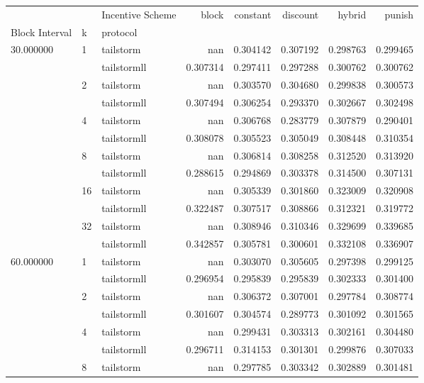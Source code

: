 \begin{tabular}{lllrrrrr}
 &  & Incentive Scheme & block & constant & discount & hybrid & punish \\
Block Interval & k & protocol &  &  &  &  &  \\
\multirow[c]{12}{*}{30.000000} & \multirow[c]{2}{*}{1} & tailstorm & nan & 0.304142 & 0.307192 & 0.298763 & 0.299465 \\
 &  & tailstormll & 0.307314 & 0.297411 & 0.297288 & 0.300762 & 0.300762 \\
 & \multirow[c]{2}{*}{2} & tailstorm & nan & 0.303570 & 0.304680 & 0.299838 & 0.300573 \\
 &  & tailstormll & 0.307494 & 0.306254 & 0.293370 & 0.302667 & 0.302498 \\
 & \multirow[c]{2}{*}{4} & tailstorm & nan & 0.306768 & 0.283779 & 0.307879 & 0.290401 \\
 &  & tailstormll & 0.308078 & 0.305523 & 0.305049 & 0.308448 & 0.310354 \\
 & \multirow[c]{2}{*}{8} & tailstorm & nan & 0.306814 & 0.308258 & 0.312520 & 0.313920 \\
 &  & tailstormll & 0.288615 & 0.294869 & 0.303378 & 0.314500 & 0.307131 \\
 & \multirow[c]{2}{*}{16} & tailstorm & nan & 0.305339 & 0.301860 & 0.323009 & 0.320908 \\
 &  & tailstormll & 0.322487 & 0.307517 & 0.308866 & 0.312321 & 0.319772 \\
 & \multirow[c]{2}{*}{32} & tailstorm & nan & 0.308946 & 0.310346 & 0.329699 & 0.339685 \\
 &  & tailstormll & 0.342857 & 0.305781 & 0.300601 & 0.332108 & 0.336907 \\
\multirow[c]{12}{*}{60.000000} & \multirow[c]{2}{*}{1} & tailstorm & nan & 0.303070 & 0.305605 & 0.297398 & 0.299125 \\
 &  & tailstormll & 0.296954 & 0.295839 & 0.295839 & 0.302333 & 0.301400 \\
 & \multirow[c]{2}{*}{2} & tailstorm & nan & 0.306372 & 0.307001 & 0.297784 & 0.308774 \\
 &  & tailstormll & 0.301607 & 0.304574 & 0.289773 & 0.301092 & 0.301565 \\
 & \multirow[c]{2}{*}{4} & tailstorm & nan & 0.299431 & 0.303313 & 0.302161 & 0.304480 \\
 &  & tailstormll & 0.296711 & 0.314153 & 0.301301 & 0.299876 & 0.307033 \\
 & \multirow[c]{2}{*}{8} & tailstorm & nan & 0.297785 & 0.303342 & 0.302889 & 0.301481 \\

\end{tabular}
